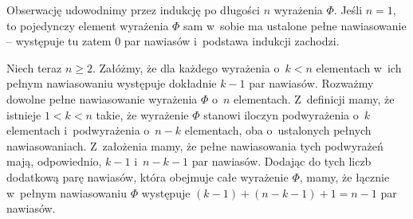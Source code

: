 \exercise %
Obserwację udowodnimy przez indukcję po długości $n$ wyrażenia $\Phi$.
Jeśli $n=1$, to pojedynczy element wyrażenia $\Phi$ sam w~sobie ma ustalone pełne nawiasowanie -- występuje tu zatem 0 par nawiasów i~podstawa indukcji zachodzi.

Niech teraz $n\ge2$.
Załóżmy, że dla każdego wyrażenia o~$k<n$ elementach w~ich pełnym nawiasowaniu występuje dokładnie $k-1$ par nawiasów.
Rozważmy dowolne pełne nawiasowanie wyrażenia $\Phi$ o~$n$ elementach.
Z~definicji mamy, że istnieje $1<k<n$ takie, że wyrażenie $\Phi$ stanowi iloczyn podwyrażenia o~$k$ elementach i~podwyrażenia o~$n-k$ elementach, oba o~ustalonych pełnych nawiasowaniach.
Z~założenia mamy, że pełne nawiasowania tych podwyrażeń mają, odpowiednio, $k-1$ i~$n-k-1$ par nawiasów.
Dodając do tych liczb dodatkową parę nawiasów, która obejmuje całe wyrażenie $\Phi$, mamy, że łącznie w~pełnym nawiasowaniu $\Phi$ występuje $(k-1)+(n-k-1)+1=n-1$ par nawiasów.
